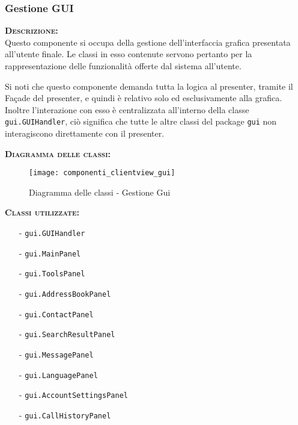\subsubsection{Gestione GUI}
\begin{description}
	\item{\scshape\bfseries Descrizione:}\\
Questo componente si occupa della gestione dell'interfaccia grafica presentata all'utente finale. Le classi in esso contenute servono pertanto per la rappresentazione delle funzionalità offerte dal sistema all'utente.

Si noti che questo componente demanda tutta la logica al presenter, tramite il Façade del presenter, e quindi è relativo solo ed esclusivamente alla grafica. Inoltre l'interazione con esso è centralizzata all'interno della classe \texttt{gui.GUIHandler}, ciò significa che tutte le altre classi del package \texttt{gui} non interagiscono direttamente con il presenter.
	\item{\scshape\bfseries Diagramma delle classi:}
	
\begin{figure}[H]
\begin{center}
\texttt{[image: componenti\_clientview\_gui]}
\caption{Diagramma delle classi - Gestione Gui}\label{fig:gestione_gui}
\end{center}
\end{figure}	
	
	\item{\scshape\bfseries Classi utilizzate:} 
	\begin{itemize}[noitemsep,nolistsep]
		\item[-] \texttt{gui.GUIHandler}
		\item[-] \texttt{gui.MainPanel}
		\item[-] \texttt{gui.ToolsPanel}
		\item[-] \texttt{gui.AddressBookPanel}
		\item[-] \texttt{gui.ContactPanel}
		\item[-] \texttt{gui.SearchResultPanel}
		\item[-] \texttt{gui.MessagePanel}
		\item[-] \texttt{gui.LanguagePanel}
		\item[-] \texttt{gui.AccountSettingsPanel}
		\item[-] \texttt{gui.CallHistoryPanel}
	\end{itemize}  
\end{description}

